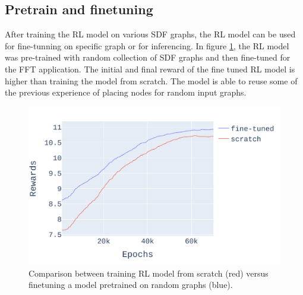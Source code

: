 \subsection{Pretrain and finetuning}

After training the RL model on various SDF graphs, the RL model can be used for fine-tunning on specific graph or for inferencing.
In figure \ref{fig:pretrain_ifft}, the RL model was pre-trained with random collection of SDF graphs and then fine-tuned for the FFT application.
The initial and final reward of the fine tuned RL model is higher than training the model from scratch.
The model is able to reuse some of the previous experience of placing nodes for random input graphs.

\begin{figure}[h]
  \centering
  \includegraphics[width=\linewidth]{fig/pretrain_ifft.pdf}
  \caption{Comparison between training RL model from scratch (red) versus finetuning a model pretrained on random graphs (blue). }
  \label{fig:pretrain_ifft}
\end{figure}

